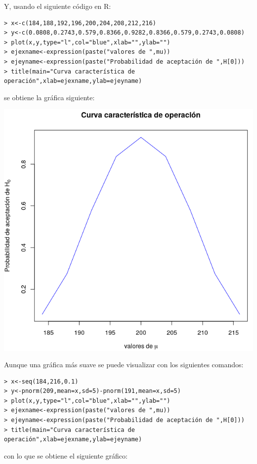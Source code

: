 \begin{solucion}
 Y, usando el siguiente c\'odigo en R:
 \begin{verbatim}
> x<-c(184,188,192,196,200,204,208,212,216)
> y<-c(0.0808,0.2743,0.579,0.8366,0.9282,0.8366,0.579,0.2743,0.0808)
> plot(x,y,type="l",col="blue",xlab="",ylab="")
> ejexname<-expression(paste("valores de ",mu))
> ejeyname<-expression(paste("Probabilidad de aceptación de ",H[0]))
> title(main="Curva característica de operación",xlab=ejexname,ylab=ejeyname)
 \end{verbatim}
 \vspace{-0.5cm}
 se obtiene la gr\'afica siguiente:
 \begin{center}
  \includegraphics[scale=0.7]{Problema_18_01.png}
 \end{center}
 Aunque una gr\'afica m\'as suave se puede visualizar con los siguientes comandos:
 \begin{verbatim}
> x<-seq(184,216,0.1)
> y<-pnorm(209,mean=x,sd=5)-pnorm(191,mean=x,sd=5)
> plot(x,y,type="l",col="blue",xlab="",ylab="")
> ejexname<-expression(paste("valores de ",mu))
> ejeyname<-expression(paste("Probabilidad de aceptación de ",H[0]))
> title(main="Curva característica de operación",xlab=ejexname,ylab=ejeyname)
 \end{verbatim}
 con lo que se obtiene el siguiente gr\'afico:
 \begin{center}

\end{center}
\end{solucion}
